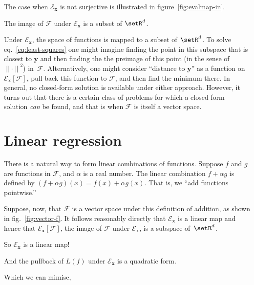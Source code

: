 \documentclass[10pt, a4paper]{article}
\begin{document}
The case when $\mathcal{E}_{\bm{x}}$ is not surjective is illustrated in
figure~\ref{fig:evalmap-in}.
\begin{marginfigure}
  \begin{center}
  \end{center}
  \caption{The image of $\mathcal{F}$ under $\mathcal{E}_{\bm{x}}$ is a subset of
    $\setR^d$.\label{fig:evalmap-in}}
\end{marginfigure}
Under $\mathcal{E}_{\bm{x}}$, the space of functions is mapped to a subset
of~$\setR^d$. To solve eq.~\eqref{eq:least-squares} one might imagine
finding the point in this subspace that is closest to $\bm{y}$ and
then finding the the preimage of this point (in the sense of
${\lVert\cdot\rVert}^2$) in~$\mathcal{F}$. Alternatively, one might consider
“distance to $\bm{y}$” as a function on
$\mathcal{E}_{\bm{x}}[\mathcal{F}]$, pull back this function to
$\mathcal{F}$, and then find the minimum there. In general, no closed-form
solution is available under either approach. However, it turns out
that there is a certain class of problems for which a closed-form
solution \emph{can} be found, and that is when $\mathcal{F}$ is itself a vector
space.

\section{Linear regression}

There is a natural way to form linear combinations of
functions. Suppose $f$ and $g$ are functions in $\mathcal{F}$, and
$\alpha$ is a real number. The linear combination $f+\alpha g$ is defined by
$(f+\alpha g)(x) = f(x)+\alpha g(x)$. That is, we “add functions pointwise.”

Suppose, now, that $\mathcal{F}$ is a vector space under this definition of
addition, as shown in fig.~\ref{fig:vector-f}. It follows reasonably
directly that $\mathcal{E}_{\bm{x}}$ is a linear map and hence that
$\mathcal{E}_{\bm{x}}[\mathcal{F}]$, the image of $\mathcal{F}$ under
$\mathcal{E}_{\bm{x}}$, is a subspace of~$\setR^d$.

So $\mathcal{E}_{\bm{x}}$ is a linear map!

And the pullback of $L(f)$ under $\mathcal{E}_{\bm{x}}$ is a quadratic form.

Which we can mimise,
\end{document}
